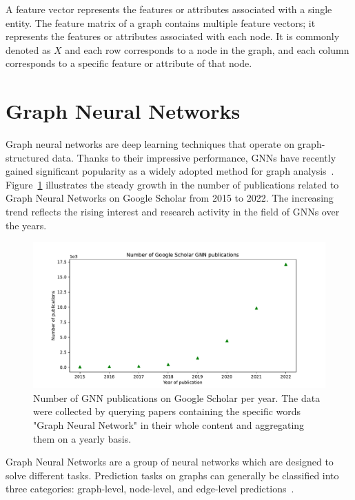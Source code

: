 A feature vector represents the features or attributes associated with a single entity.
The feature matrix of a graph contains multiple feature vectors; it represents the features or attributes associated with each node.
It is commonly denoted as $X$ and  each row corresponds to a node in the graph, and each column corresponds to a specific feature or attribute of that node.

\section{Graph Neural Networks}
\label{sec:graph_neural_networks}%


Graph neural networks are deep learning techniques that operate on graph-structured data.
Thanks to their impressive performance, GNNs have recently gained significant popularity as a widely adopted method for graph analysis~\cite{KERAMATFAR2022100401}.
Figure~\ref{fig:google_scholar} illustrates the steady growth in the number of publications related to Graph Neural Networks on Google Scholar from 2015 to 2022.
The increasing trend reflects the rising interest and research activity in the field of GNNs over the years.

\begin{figure}[t]
    \centering
    \includegraphics[height=0.4\textwidth]{Images/google_scholar_green}
    \caption[Number of GNN publications on Google Scholar per year]{Number of GNN publications on Google Scholar per year. The data were collected by querying papers containing the specific words "Graph Neural Network" in their whole content and aggregating them on a yearly basis.}
    \label{fig:google_scholar}
\end{figure}

Graph Neural Networks are a group of neural networks which are designed to solve different tasks.
Prediction tasks on graphs can generally be classified into three categories: graph-level, node-level, and edge-level predictions~\cite{sanchez-lengeling2021a}.


